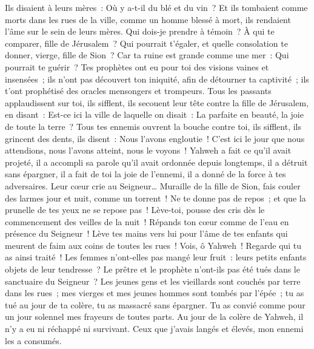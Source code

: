 \begin{multicols}{2}
 Ils disaient à leurs mères~: Où y a-t-il du blé et du vin~? Et ils tombaient comme morts dans les rues de la ville, comme un homme blessé à mort, ils rendaient l'âme sur le sein de leurs mères.
 Qui dois-je prendre à témoin~? À qui te comparer, fille de Jérusalem~? Qui pourrait t'égaler, et quelle consolation te donner, vierge, fille de Sion~? Car ta ruine est grande comme une mer~: Qui pourrait te guérir~?
 Tes prophètes ont eu pour toi des visions vaines et insensées~; ils n'ont pas découvert ton iniquité, afin de détourner ta captivité~; ils t'ont prophétisé des oracles mensongers et trompeurs.
 Tous les passants applaudissent sur toi, ils sifflent, ils secouent leur tête contre la fille de Jérusalem, en disant~: Est-ce ici la ville de laquelle on disait~: La parfaite en beauté, la joie de toute la terre~?
 Tous tes ennemis ouvrent la bouche contre toi, ils sifflent, ils grincent des dents, ils disent~: Nous l'avons engloutie~! C'est ici le jour que nous attendions, nous l'avons atteint, nous le voyons~!
 Yahweh a fait ce qu'il avait projeté, il a accompli sa parole qu'il avait ordonnée depuis longtemps, il a détruit sans épargner, il a fait de toi la joie de l'ennemi, il a donné de la force à tes adversaires.
 Leur cœur crie au Seigneur… Muraille de la fille de Sion, fais couler des larmes jour et nuit, comme un torrent~! Ne te donne pas de repos~; et que la prunelle de tes yeux ne se repose pas~!
 Lève-toi, pousse des cris dès le commencement des veilles de la nuit~! Répands ton cœur comme de l'eau en présence du Seigneur~! Lève tes mains vers lui pour l'âme de tes enfants qui meurent de faim aux coins de toutes les rues~!
 Vois, ô Yahweh~! Regarde qui tu as ainsi traité~! Les femmes n'ont-elles pas mangé leur fruit~: leurs petits enfants objets de leur tendresse~? Le prêtre et le prophète n'ont-ils pas été tués dans le sanctuaire du Seigneur~?
 Les jeunes gens et les vieillards sont couchés par terre dans les rues~; mes vierges et mes jeunes hommes sont tombés par l'épée~; tu as tué au jour de ta colère, tu as massacré sans épargner.
 Tu as convié comme pour un jour solennel mes frayeurs de toutes parts. Au jour de la colère de Yahweh, il n'y a eu ni réchappé ni survivant. Ceux que j'avais langés et élevés, mon ennemi les a consumés.

\end{multicols}
